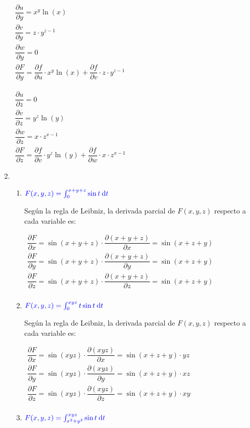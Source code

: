 \begin{enumerate}[label=\c olor{red}\textbf{\arabic*)}, leftmargin=*]
$\begin{array}{l}
\dfrac{\partial u}{\partial y}=x^{y}\ln(x)\\
\dfrac{\partial v}{\partial y}=z\cdot y^{z-1}\\
\dfrac{\partial w}{\partial y}=0\\
\dfrac{\partial F}{\partial y}=\dfrac{\partial f}{\partial u}\cdot x^{y}\ln(x)+\dfrac{\partial f}{\partial v}\cdot z\cdot y^{z-1}
\end{array}$

$\begin{array}{l}
\dfrac{\partial u}{\partial z}=0\\
\dfrac{\partial v}{\partial z}=y^{z}\ln(y)\\
\dfrac{\partial w}{\partial z}=x\cdot z^{x-1}\\
\dfrac{\partial F}{\partial z}=\dfrac{\partial f}{\partial v}\cdot y^{z}\ln(y)+\dfrac{\partial f}{\partial w}\cdot x\cdot z^{x-1}
\end{array}$

\item {}
\begin{enumerate}[label=\color{red}\textbf{\alph*)}]
	\item $\textcolor{blue}{F(x,y,z)=\int_{0}^{x+y+z}\sin t\:\mathrm{d}t}$
	
	Según la regla de Leibniz, la derivada parcial de $F(x,y,z)$ respecto a cada variable es:
	
	$\begin{array}{l}
	\dfrac{\partial F}{\partial x}=\sin(x+y+z)\cdot\dfrac{\partial (x+y+z)}{\partial x}=\sin(x+z+y)\\
	\dfrac{\partial F}{\partial y}=\sin(x+y+z)\cdot\dfrac{\partial (x+y+z)}{\partial y}=\sin(x+z+y)\\
	\dfrac{\partial F}{\partial z}=\sin(x+y+z)\cdot\dfrac{\partial (x+y+z)}{\partial z}=\sin(x+z+y)\\
	\end{array}$
	\item $\textcolor{blue}{F(x,y,z)=\int_{0}^{xyz}t\sin t\:\mathrm{d}t}$
	
	Según la regla de Leibniz, la derivada parcial de $F(x,y,z)$ respecto a cada variable es:
		
		$\begin{array}{l}
		\dfrac{\partial F}{\partial x}=\sin(xyz)\cdot\dfrac{\partial (xyz)}{\partial x}=\sin(x+z+y)\cdot yz\\
		\dfrac{\partial F}{\partial y}=\sin(xyz)\cdot\dfrac{\partial (xyz)}{\partial y}=\sin(x+z+y)\cdot xz\\
		\dfrac{\partial F}{\partial z}=\sin(xyz)\cdot\dfrac{\partial (xyz)}{\partial z}=\sin(x+z+y)\cdot xy\\
		\end{array}$
	\item $\textcolor{blue}{F(x,y,z)=\int_{x^2+y^2}^{xyz}\sin t\:\mathrm{d}t}$
	

\end{enumerate}
\end{enumerate}
